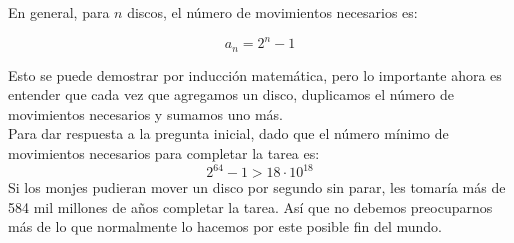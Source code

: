 En general, para $n$ discos, el número de movimientos necesarios es:

\[
a_n = 2^n - 1
\]

Esto se puede demostrar por inducción matemática, pero lo importante ahora es entender que cada vez que agregamos un disco, duplicamos el número de movimientos necesarios y sumamos uno más.\\

Para dar respuesta a la pregunta inicial, dado que el número mínimo de movimientos necesarios para completar la tarea es:
\[
2^{64} - 1 > 18 \cdot 10^{18}
\]
Si los monjes pudieran mover un disco por segundo sin parar, les tomaría más de 584 mil millones de años completar la tarea. Así que no debemos preocuparnos más de lo que normalmente lo hacemos por este posible fin del mundo.
